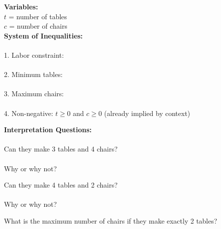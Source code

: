 \documentclass[12pt]{article}
\begin{document}
	        \textbf{Variables:}\\
	        $t$ = number of tables\\
	        $c$ = number of chairs\\
	
	        \textbf{System of Inequalities:}\\\\
	        1. Labor constraint: \underline{\hspace{4in}}\\\\
	        2. Minimum tables: \underline{\hspace{4in}}\\\\
	        3. Maximum chairs: \underline{\hspace{4in}}\\\\
	        4. Non-negative: $t \geq 0$ and $c \geq 0$ (already implied by context)\\
	
	        \newpage
	
	        \textbf{Interpretation Questions:}\\\\
		    Can they make 3 tables and 4 chairs?\\\\
			Why or why not?
	
		    \vspace{4cm}
		
		    Can they make 4 tables and 2 chairs?\\\\
			Why or why not?
			
		    \vspace{4cm}
	
		    What is the maximum number of chairs if they make exactly 2 tables?
	
\end{document}
